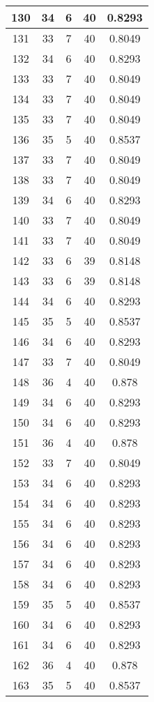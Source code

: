 \documentclass[letterpaper, 12pt]{article}
\begin{document}
\begin{longtable}{|c|c|c|c|c|}
\hline
130 & 34 & 6 & 40 & 0.8293 \\
\hline
131 & 33 & 7 & 40 & 0.8049 \\
\hline
132 & 34 & 6 & 40 & 0.8293 \\
\hline
133 & 33 & 7 & 40 & 0.8049 \\
\hline
134 & 33 & 7 & 40 & 0.8049 \\
\hline
135 & 33 & 7 & 40 & 0.8049 \\
\hline
136 & 35 & 5 & 40 & 0.8537 \\
\hline
137 & 33 & 7 & 40 & 0.8049 \\
\hline
138 & 33 & 7 & 40 & 0.8049 \\
\hline
139 & 34 & 6 & 40 & 0.8293 \\
\hline
140 & 33 & 7 & 40 & 0.8049 \\
\hline
141 & 33 & 7 & 40 & 0.8049 \\
\hline
142 & 33 & 6 & 39 & 0.8148 \\
\hline
143 & 33 & 6 & 39 & 0.8148 \\
\hline
144 & 34 & 6 & 40 & 0.8293 \\
\hline
145 & 35 & 5 & 40 & 0.8537 \\
\hline
146 & 34 & 6 & 40 & 0.8293 \\
\hline
147 & 33 & 7 & 40 & 0.8049 \\
\hline
148 & 36 & 4 & 40 & 0.878 \\
\hline
149 & 34 & 6 & 40 & 0.8293 \\
\hline
150 & 34 & 6 & 40 & 0.8293 \\
\hline
151 & 36 & 4 & 40 & 0.878 \\
\hline
152 & 33 & 7 & 40 & 0.8049 \\
\hline
153 & 34 & 6 & 40 & 0.8293 \\
\hline
154 & 34 & 6 & 40 & 0.8293 \\
\hline
155 & 34 & 6 & 40 & 0.8293 \\
\hline
156 & 34 & 6 & 40 & 0.8293 \\
\hline
157 & 34 & 6 & 40 & 0.8293 \\
\hline
158 & 34 & 6 & 40 & 0.8293 \\
\hline
159 & 35 & 5 & 40 & 0.8537 \\
\hline
160 & 34 & 6 & 40 & 0.8293 \\
\hline
161 & 34 & 6 & 40 & 0.8293 \\
\hline
162 & 36 & 4 & 40 & 0.878 \\
\hline
163 & 35 & 5 & 40 & 0.8537 \\

\end{longtable}
\end{document}
